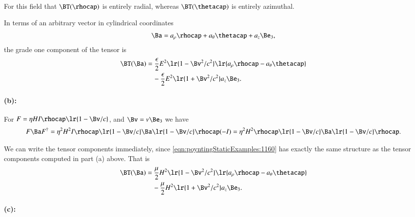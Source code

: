 For this field that \( \BT(\rhocap) \) is entirely radial, whereas \( \BT(\thetacap) \) is entirely azimuthal.

In terms of an arbitrary vector in cylindrical coordinates
\begin{dmath}\label{eqn:poyntingStaticExamples:1200}
\Ba = a_\rho \rhocap + a_\theta \thetacap + a_z \Be_3,
\end{dmath}
the grade one component of the tensor is
\begin{dmath}\label{eqn:poyntingStaticExamples:1140}
\begin{aligned}
\BT(\Ba) &=
\frac{\epsilon}{2} E^2 \lr{1 -\Bv^2/c^2} \lr{ a_\rho \rhocap - a_\theta \thetacap } \\
&\quad -\frac{\epsilon}{2} E^2 \lr{1 +\Bv^2/c^2} a_z \Be_3.
\end{aligned}
\end{dmath}

\paragraph{(b):}

For \( F = \eta H I \rhocap \lr{ 1 - \Bv/c } \), and \( \Bv = v \Be_3 \) we have
\begin{dmath}\label{eqn:poyntingStaticExamples:1160}
F \Ba F^\dagger
=
\eta^2 H^2 I \rhocap \lr{ 1 - \Bv/c } \Ba \lr{ 1 - \Bv/c } \rhocap (-I)
=
\eta^2 H^2 \rhocap \lr{ 1 - \Bv/c } \Ba \lr{ 1 - \Bv/c } \rhocap.
\end{dmath}

We can write the tensor components immediately, since
\cref{eqn:poyntingStaticExamples:1160}
has exactly the same structure as the tensor components computed in part (a) above.  That is
\begin{dmath}\label{eqn:poyntingStaticExamples:1180}
\begin{aligned}
\BT(\Ba) &=
\frac{\mu}{2} H^2 \lr{1 -\Bv^2/c^2} \lr{ a_\rho \rhocap - a_\theta \thetacap } \\
&\quad -\frac{\mu}{2} H^2 \lr{1 +\Bv^2/c^2} a_z \Be_3.
\end{aligned}
\end{dmath}

\paragraph{(c):}

